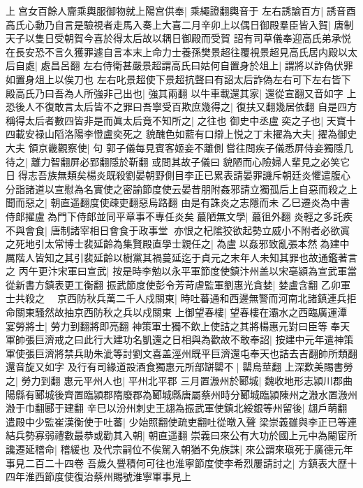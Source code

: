 上宫女百餘人齎乘輿服御物就上陽宫供奉|{
	乘繩證翻輿音于}
左右誘諭百方|{
	誘音酉}
高氏心動乃自言是驗視者走馬入奏上大喜二月辛卯上以偶日御殿羣臣皆入賀|{
	唐制天子以隻日受朝賀今喜於得太后故以耦日御殿而受賀}
詔有司草儀奉迎高氏弟承悦在長安恐不言久獲罪遽自言本末上命力士養孫樊景超往覆視景超見高氏居内殿以太后自處|{
	處昌呂翻}
左右侍衛甚嚴景超謂高氏曰姑何自置身於俎上|{
	謂將以詐偽伏罪如置身俎上以俟刀也}
左右叱景超使下景超抗聲曰有詔太后詐偽左右可下左右皆下殿高氏乃曰吾為人所強非己出也|{
	強其兩翻}
以牛車載還其家|{
	還從宣翻又音如字}
上恐後人不復敢言太后皆不之罪曰吾寧受百欺庶幾得之|{
	復扶又翻幾居依翻}
自是四方稱得太后者數四皆非是而眞太后竟不知所之|{
	之往也}
御史中丞盧奕之子也|{
	天寶十四載安禄山䧟洛陽李憕盧奕死之}
貌醜色如藍有口辯上悦之丁未擢為大夫|{
	擢為御史大夫}
領京畿觀察使|{
	句}
郭子儀每見賓客姬妾不離側嘗往問疾子儀悉屏侍妾獨隱几待之|{
	離力智翻屏必郢翻隱於靳翻}
或問其故子儀曰貌陋而心險婦人輩見之必笑它日得志吾族無類矣楊炎既殺劉晏朝野側目李正已累表請晏罪譏斥朝廷炎懼遣腹心分詣諸道以宣慰為名實使之密諭節度使云晏昔朋附姦邪請立獨孤后上自惡而殺之上聞而惡之|{
	朝直遥翻度使疎吏翻惡烏路翻}
由是有誅炎之志隱而未乙巳遷炎為中書侍郎擢盧為門下侍郎並同平章事不專任炎矣蕞陋無文學|{
	蕞徂外翻}
炎輕之多託疾不與會食|{
	唐制諸宰相日會食于政事堂}
亦恨之杞隂狡欲起勢立威小不附者必欲寘之死地引太常博士裴延齡為集賢殿直學士親任之|{
	為盧以姦邪致亂張本然為建中厲階人皆知之其引裴延齡以樹黨其禍蔓延迄于貞元之末年人未知其罪也故通鑑著言之}
丙午更汴宋軍曰宣武|{
	按是時李勉以永平軍節度使鎮汴州盖以宋亳潁為宣武軍當從新書方鎮表更工衡翻}
振武節度使彭令芳苛虐監軍劉惠光貪婪|{
	婪盧含翻}
乙卯軍士共殺之　京西防秋兵萬二千人戍關東|{
	時吐蕃通和西邊無警而河南北諸鎮連兵拒命關東騷然故抽京西防秋之兵以戍關東}
上御望春樓|{
	望春樓在灞水之西臨廣運潭}
宴勞將士|{
	勞力到翻將即亮翻}
神策軍士獨不飲上使詰之其將楊惠元對曰臣等奉天軍帥張巨濟戒之曰此行大建功名凱還之日相與為歡故不敢奉詔|{
	按建中元年遣神策軍使張巨濟將禁兵助朱泚等討劉文喜盖涇州既平巨濟還屯奉天也詰去吉翻帥所類翻還音旋又如字}
及行有司緣道設酒食獨惠元所部缾罌不|{
	罌烏莖翻}
上深歎美賜書勞之|{
	勞力到翻}
惠元平州人也|{
	平州北平郡}
三月置溵州於郾城|{
	魏收地形志潁川郡曲陽縣有郾城後齊置臨潁郡隋廢郡為郾城縣唐屬蔡州時分郾城臨潁陳州之溵水置溵州溵于巾翻郾于建翻}
辛巳以汾州刺史王翃為振武軍使鎮北綏銀等州留後|{
	翃戶萌翻}
遣殿中少監崔漢衡使于吐蕃|{
	少始照翻使疏吏翻吐從暾入聲}
梁崇義雖與李正已等連結兵勢寡弱禮數最恭或勸其入朝|{
	朝直遥翻}
崇義曰來公有大功於國上元中為閹宦所讒遷延稽命|{
	稽緩也}
及代宗嗣位不俟駕入朝猶不免族誅|{
	來公謂來瑱死于廣德元年事見二百二十四卷}
吾歲久舋積何可往也淮寧節度使李希烈屢請討之|{
	方鎮表大歷十四年淮西節度使復治蔡州賜號淮寧軍事見上}
